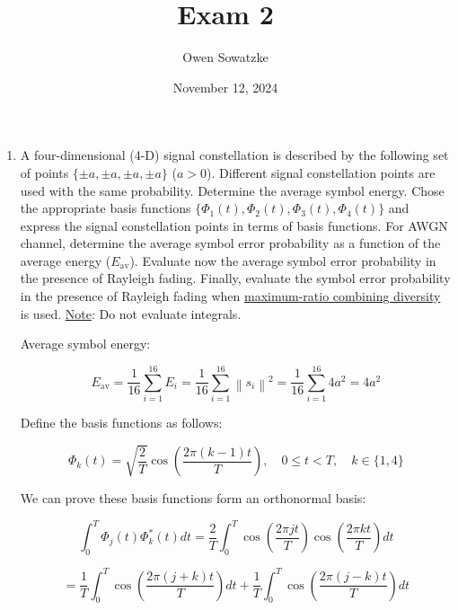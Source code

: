 \documentclass[fleqn]{article}
\title{Exam 2}
\author{Owen Sowatzke}
\date{November 12, 2024}
\newcommand{\zerodisplayskip}{
	\setlength{\abovedisplayskip}{0pt}%
	\setlength{\belowdisplayskip}{0pt}%
	\setlength{\abovedisplayshortskip}{0pt}%
	\setlength{\belowdisplayshortskip}{0pt}%
	\setlength{\mathindent}{0pt}}
\newcommand{\norm}[1]{\left \lVert #1 \right \rVert}
\begin{document}
	\offinterlineskip
	\setlength{\lineskip}{12pt}
	\zerodisplayskip
	\maketitle
	
	\begin{enumerate}
		\item A four-dimensional (4-D) signal constellation is described by the following set of points $\{\pm a, \pm a, \pm a, \pm a\}$ ($a>0$). Different signal constellation points are used with the same probability. Determine the average symbol energy. Chose the appropriate basis functions $\{\Phi_1(t), \Phi_2(t), \Phi_3(t), \Phi_4(t)\}$ and express the signal constellation points in terms of basis functions. For AWGN channel, determine the average symbol error probability as a function of the average energy ($E_\text{av}$). Evaluate now the average symbol error probability in the presence of Rayleigh fading. Finally, evaluate the symbol error probability in the presence of Rayleigh fading when \underline{maximum-ratio combining diversity} is used. \underline{Note}: Do not evaluate integrals.

		Average symbol energy:
		
		\begin{equation*}
			E_\text{av} = \frac{1}{16}\sum_{i=1}^{16}{E_i} = \frac{1}{16}\sum_{i=1}^{16}{\norm{s_i}^2} = \frac{1}{16}\sum_{i=1}^{16}{4a^2} = 4a^2
		\end{equation*}
		
		Define the basis functions as follows:
		
		\begin{equation*}
			\Phi_k(t) = \sqrt{\frac{2}{T}}\cos\left(\frac{2{\pi}(k-1)t}{T}\right),\quad 0 \leq t < T,\quad k \in \{1,4\}
		\end{equation*}
		
		We can prove these basis functions form an orthonormal basis:
		
		\begin{equation*}
			\int_{0}^{T}{\Phi_j(t)\Phi_k^*(t)dt} = \frac{2}{T}\int_{0}^{T}{\cos\left(\frac{2{\pi}jt}{T}\right)\cos\left(\frac{2{\pi}kt}{T}\right)dt}
		\end{equation*}
		
		\begin{equation*}
			= \frac{1}{T}\int_{0}^{T}{\cos\left(\frac{2{\pi}(j+k)t}{T}\right)dt} + \frac{1}{T}\int_{0}^{T}{\cos\left(\frac{2{\pi}(j-k)t}{T}\right)dt}
		\end{equation*}
		

\end{enumerate}
\end{document}
